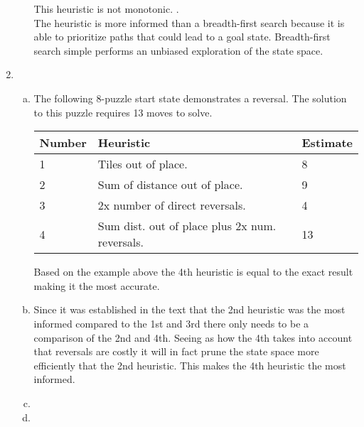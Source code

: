 \documentclass[11pt]{article}
\begin{document}
\begin{enumerate}[1.]
\begin{enumerate}[a.]
  This heuristic is not monotonic. . \\
  
  The heuristic is more informed than a breadth-first search because it is able to prioritize paths that could lead to a goal state. Breadth-first search simple performs an unbiased exploration of the state space.\\
  \end{enumerate}

\item
  \begin{enumerate}[a.]
  \item The following 8-puzzle start state demonstrates a reversal. The solution to this puzzle requires 13 moves to solve.

\begin{figure}[htbp]
    \centering
{}
\end{figure}


\begin{center} 
\begin{tabular}{| l | l | l |} 
\hline Number & \textbf{Heuristic} & \textbf{Estimate}\\
\hline 1 & Tiles out of place. & 8\\ 
\hline 2 & Sum of distance out of place. &  9\\ 
\hline 3 & 2x number of direct reversals. & 4  \\ 
\hline 4 & Sum dist. out of place plus 2x num. reversals. & 13 \\
\hline 
\end{tabular} 
\end{center} 

Based on the example above the 4th heuristic is equal to the exact result making it the most accurate.\\
  \item
  Since it was established in the text that the 2nd heuristic was the most informed compared to the 1st and 3rd there only needs to be a comparison of the 2nd and 4th. Seeing as how the 4th takes into account that reversals are costly it will in fact prune the state space more efficiently that the 2nd heuristic. This makes the 4th heuristic the most informed.\\
  \item
  
  \item

  \end{enumerate}
\end{enumerate}
\end{document}
